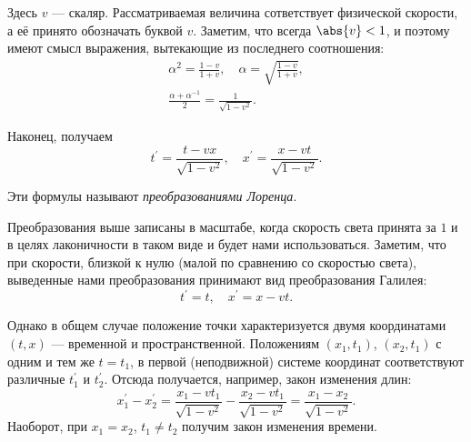Здесь $v$ --- скаляр. Рассматриваемая величина сответствует физической скорости, а её принято обозначать буквой $v$. Заметим, что всегда $\abs{v} < 1$, и поэтому имеют смысл выражения, вытекающие из последнего соотношения:
\begin{gather*}
    \alpha^2 = \frac{1 - v}{1 + v},\quad\alpha = \sqrt{\frac{1 - v}{1 + v}},\\
    \frac{\alpha + \alpha^{-1}}{2} = \frac{1}{\sqrt{1 - v^2}}.
\end{gather*}

Наконец, получаем
\[
    t^\prime = \frac{t - vx}{\sqrt{1 - v^2}},\quad x^\prime = \frac{x - vt}{\sqrt{1 - v^2}}.
\]

\begin{definition}
    Эти формулы называют \textit{преобразованиями Лоренца}.
\end{definition}

Преобразования выше записаны в масштабе, когда скорость света принята за $1$ и в целях лаконичности в таком виде и будет нами использоваться. Заметим, что при скорости, близкой к нулю (малой по сравнению со скоростью света), выведенные нами преобразования принимают вид преобразования Галилея:
\[
    t^\prime = t,\quad x^\prime = x - vt.
\]

Однако в общем случае положение точки характеризуется двумя координатами $(t, x)$ --- временной и пространственной. Положениям $(x_1, t_1)$, $(x_2, t_1)$ с одним и тем же $t = t_1$, в первой (неподвижной) системе координат соответствуют различные $t_1^\prime$ и $t_2^\prime$. Отсюда получается, например, закон изменения длин:
\[
    x_1^\prime - x_2^\prime = \frac{x_1 - vt_1}{\sqrt{1 - v^2}} - \frac{x_2 - vt_1}{\sqrt{1 - v^2}} = \frac{x_1 - x_2}{\sqrt{1 - v^2}}.
\]
Наоборот, при $x_1 = x_2$, $t_1 \ne t_2$ получим закон изменения времени.



